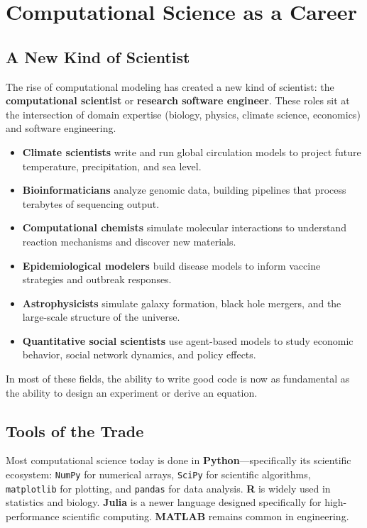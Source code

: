 \documentclass[11pt,letterpaper]{article}
\newcommand{\keyterm}[1]{\textbf{\textcolor{cssecondary}{#1}}}
\begin{document}
\section{Computational Science as a Career}

\subsection{A New Kind of Scientist}

The rise of computational modeling has created a new kind of scientist: the \keyterm{computational scientist} or \keyterm{research software engineer}. These roles sit at the intersection of domain expertise (biology, physics, climate science, economics) and software engineering.

\begin{conceptbox}
\begin{itemize}[itemsep=3pt]
    \item \textbf{Climate scientists} write and run global circulation models to project future temperature, precipitation, and sea level.
    \item \textbf{Bioinformaticians} analyze genomic data, building pipelines that process terabytes of sequencing output.
    \item \textbf{Computational chemists} simulate molecular interactions to understand reaction mechanisms and discover new materials.
    \item \textbf{Epidemiological modelers} build disease models to inform vaccine strategies and outbreak responses.
    \item \textbf{Astrophysicists} simulate galaxy formation, black hole mergers, and the large-scale structure of the universe.
    \item \textbf{Quantitative social scientists} use agent-based models to study economic behavior, social network dynamics, and policy effects.
\end{itemize}
In most of these fields, the ability to write good code is now as fundamental as the ability to design an experiment or derive an equation.
\end{conceptbox}

\subsection{Tools of the Trade}

Most computational science today is done in \textbf{Python}---specifically its scientific ecosystem: \texttt{NumPy} for numerical arrays, \texttt{SciPy} for scientific algorithms, \texttt{matplotlib} for plotting, and \texttt{pandas} for data analysis. \textbf{R} is widely used in statistics and biology. \textbf{Julia} is a newer language designed specifically for high-performance scientific computing. \textbf{MATLAB} remains common in engineering.
\end{document}
